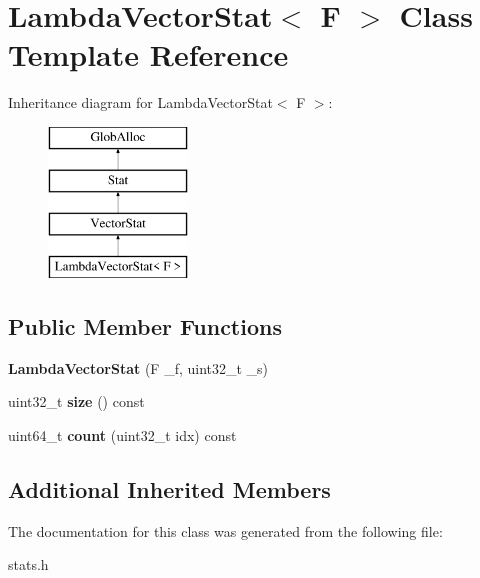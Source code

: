 \hypertarget{classLambdaVectorStat}{\section{Lambda\-Vector\-Stat$<$ F $>$ Class Template Reference}
\label{classLambdaVectorStat}
}
Inheritance diagram for Lambda\-Vector\-Stat$<$ F $>$\-:\begin{figure}[H]
\begin{center}
\leavevmode
\includegraphics[height=4.000000cm]{classLambdaVectorStat}
\end{center}
\end{figure}
\subsection*{Public Member Functions}
\begin{DoxyCompactItemize}
\item 
\hypertarget{classLambdaVectorStat_a36d12c74f96d863725cb1b5b402e524b}{{\bfseries Lambda\-Vector\-Stat} (F \-\_\-f, uint32\-\_\-t \-\_\-s)}\label{classLambdaVectorStat_a36d12c74f96d863725cb1b5b402e524b}

\item 
\hypertarget{classLambdaVectorStat_a63e1c70625f3c350e59a99a7e2c94464}{uint32\-\_\-t {\bfseries size} () const }\label{classLambdaVectorStat_a63e1c70625f3c350e59a99a7e2c94464}

\item 
\hypertarget{classLambdaVectorStat_a7d53721746baf822cab7ecaffdc3cc0e}{uint64\-\_\-t {\bfseries count} (uint32\-\_\-t idx) const }\label{classLambdaVectorStat_a7d53721746baf822cab7ecaffdc3cc0e}

\end{DoxyCompactItemize}
\subsection*{Additional Inherited Members}


The documentation for this class was generated from the following file\-:\begin{DoxyCompactItemize}
\item 
stats.\-h\end{DoxyCompactItemize}
